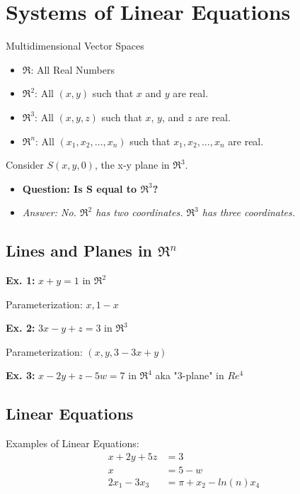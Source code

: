 \section{Systems of Linear Equations}
\begin{definition}
Multidimensional Vector Spaces
\begin{itemize}
    \item $\Re$: All Real Numbers
    \item $\Re^2$: All \((x, y)\) such that \(x\) and \(y\) are real.
    \item $\Re^3$: All \((x, y, z)\) such that \(x\), \(y\), and \(z\) are real.
    \item $\Re^n$: All \((x_1, x_2, \dots, x_n)\) such that \(x_1, x_2, \dots, x_n\) are real.
\end{itemize}
\end{definition}

\noindent
Consider \(S(x, y, 0)\), the x-y plane in \(\Re^3\).
\begin{itemize}
    \item \textbf{Question: Is S equal to \(\Re^3\)?}
    \item \textit{Answer: No. \(\Re^2\) has two coordinates. \(\Re^3\) has three coordinates.}
\end{itemize}

\subsection{Lines and Planes in \(\Re^n\)}
\textbf{Ex. 1:}
\(x + y = 1\) in \(\Re^2\)

\noindent
Parameterization:
\(x, 1-x\)

\noindent
\newline
\textbf{Ex. 2:}
\(3x - y + z = 3\) in \(\Re^3\)

\noindent
Parameterization:
\((x, y, 3 - 3x + y)\)

\noindent
\newline
\textbf{Ex. 3:}
\(x - 2y + z - 5w = 7\) in \(\Re^4\) aka "3-plane" in \(Re^4\)

\subsection{Linear Equations}
Examples of Linear Equations:
\begin{align}
    x +2y + 5z &= 3 \\
    x &= 5 - w \\
    2x_1 - 3 x_3 &= \pi + x_2 - ln(n)x_4
\end{align}

